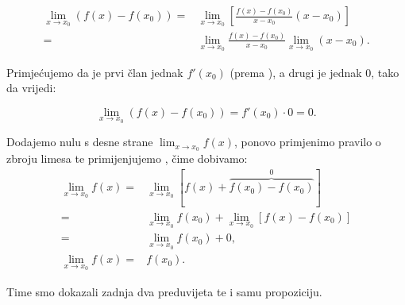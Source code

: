 \begin{align*}
\lim_{x\to x_0}(f(x) - f(x_0)) =& \lim_{x\to x_0}\left[\frac{f(x)-f(x_0)}{x-x_0}(x-x_0)\right]\\
=&\lim_{x\to x_0}\frac{f(x)-f(x_0)}{x-x_0}\lim_{x\to x_0}(x-x_0).
\end{align*}

Primjećujemo da je prvi član jednak $f'(x_0)$ (prema ), a drugi je jednak 0, tako da vrijedi:

\begin{equation}
    \label{eq:diff_zero_sized}
    \lim_{x\to x_0}(f(x)-f(x_0)) = f'(x_0)\cdot0 = 0.
\end{equation}

Dodajemo nulu s desne strane $\lim_{x\to x_0}f(x)$, ponovo primjenimo pravilo o zbroju limesa
te primijenjujemo , čime dobivamo:
\begin{align*}
\lim_{x\to x_0}f(x) =& \lim_{x\to x_0}[f(x)+\overbrace{f(x_0)-f(x_0)}^0]\\
=& \lim_{x\to x_0}f(x_0) + \lim_{x\to x_0}[f(x)-f(x_0)]\\
=& \lim_{x\to x_0}f(x_0) + 0,\\
\lim_{x\to x_0}f(x) =& f(x_0).
\end{align*}

Time smo dokazali zadnja dva preduvijeta te i samu propoziciju.
